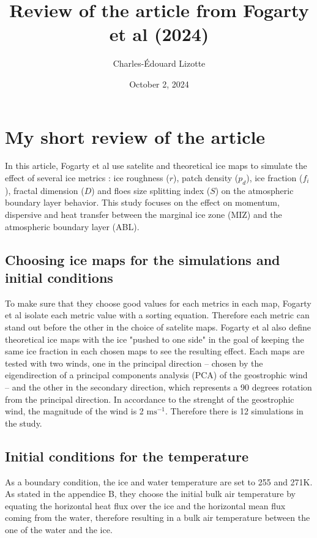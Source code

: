 \documentclass[10pt]{article}
\author{Charles-Édouard Lizotte}
\date{October 2, 2024}
\title{Review of the article from Fogarty et al (2024)}
\numberwithin{equation}{section}
\begin{document}
\maketitle
\tableofcontents

\section{My short review of the article}
\label{sec:org0fff042}

In this article, Fogarty et al use satelite and theoretical ice maps to simulate the effect of several ice metrics : ice roughness (\(r\)), patch density (\(p_d\)), ice fraction (\(f_i\)), fractal dimension (\(D\)) and floes size splitting index (\(S\)) on the atmospheric boundary layer behavior. This study focuses on the effect on momentum, dispersive and heat transfer between the marginal ice zone (MIZ) and the atmospheric boundary layer (ABL).
\subsection{Choosing ice maps for the simulations and initial conditions}
\label{sec:orgd69587d}

To make sure that they choose good values for each metrics in each map, Fogarty et al isolate each metric value with a sorting equation. Therefore each metric can stand out before the other in the choice of satelite maps. Fogarty et al also define theoretical ice maps with the ice "pushed to one side" in the goal of keeping the same ice fraction in each chosen maps to see the resulting effect.
Each maps are tested with two winds, one in the principal direction -- chosen by the eigendirection of a principal components analysis (PCA) of the geostrophic wind -- and the other in the secondary direction, which represents a 90 degrees rotation from the principal direction. In accordance to the strenght of the geostrophic wind, the magnitude of the wind is 2 \(\mathrm{ms}^{-1}\). Therefore there is 12 simulations in the study.
\subsection{Initial conditions for the temperature}
\label{sec:org19243b9}

As a boundary condition, the ice and water temperature are set to 255 and 271K. As stated in the appendice B, they choose the initial bulk air temperature by equating the horizontal heat flux over the ice and the horizontal mean flux coming from the water, therefore resulting in a bulk air temperature between the one of the water and the ice.
\end{document}
